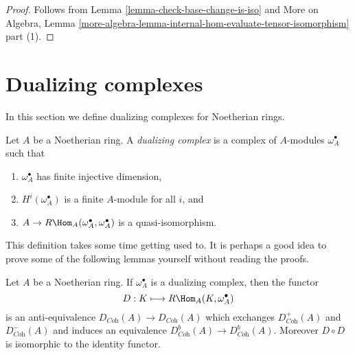 \begin{proof}
Follows from Lemma \ref{lemma-check-base-change-is-iso} and
More on Algebra, Lemma
\ref{more-algebra-lemma-internal-hom-evaluate-tensor-isomorphism} part (1).
\end{proof}







\section{Dualizing complexes}
\label{section-dualizing}

\noindent
In this section we define dualizing complexes for Noetherian rings.

\begin{definition}
\label{definition-dualizing}
Let $A$ be a Noetherian ring. A {\it dualizing complex} is a
complex of $A$-modules $\omega_A^\bullet$ such that
\begin{enumerate}
\item $\omega_A^\bullet$ has finite injective dimension,
\item $H^i(\omega_A^\bullet)$ is a finite $A$-module for all $i$, and
\item $A \to R\Hom_A(\omega_A^\bullet, \omega_A^\bullet)$
is a quasi-isomorphism.
\end{enumerate}
\end{definition}

\noindent
This definition takes some time getting used to. It is perhaps a good
idea to prove some of the following lemmas yourself without reading
the proofs.

\begin{lemma}
\label{lemma-dualizing}
Let $A$ be a Noetherian ring. If $\omega_A^\bullet$ is a dualizing
complex, then the functor
$$
D : K \longmapsto R\Hom_A(K, \omega_A^\bullet)
$$
is an anti-equivalence $D_{\textit{Coh}}(A) \to D_{\textit{Coh}}(A)$
which exchanges $D^+_{\textit{Coh}}(A)$ and $D^-_{\textit{Coh}}(A)$
and induces an equivalence $D^b_{\textit{Coh}}(A) \to D^b_{\textit{Coh}}(A)$.
Moreover $D \circ D$ is isomorphic to the identity functor.
\end{lemma}

